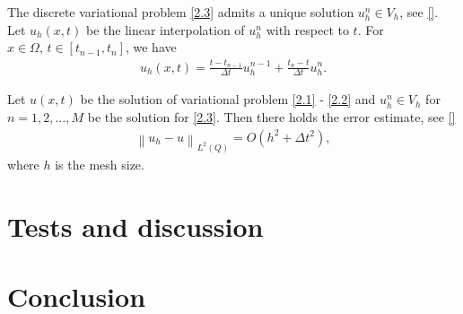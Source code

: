 \documentclass[twocolumn]{article}
\begin{document}
The discrete variational problem \eqref{2.3} admits a unique solution $u^n_h\in V_h$, see \eqref{}. Let $u_h(x, t)$ be the linear interpolation of $u_h^n$ with respect to $t$. 
For $x\in \Omega,\, t\in [t_{n-1}, t_n]$, we have
\begin{align*}
	u_h(x, t)=\frac{t-t_{n-1}}{\Delta t}u_h^{n-1}+\frac{t_n-t}{\Delta t}u_h^{n}.
\end{align*}
\begin{dl}\label{dl2.1}
	Let $u(x, t)$ be the solution of variational problem \eqref{2.1} - \eqref{2.2} and $u^n_h\in V_h$ for $n=1, 2, \dots, M$ be the solution for \eqref{2.3}. Then there holds the error estimate, see \eqref{}
	\begin{align}\label{2.5}
		\left\|u_h-u\right\|_{L^2(Q)}=O\left(h^2+\Delta t^2\right),
	\end{align}
	where $h$ is the mesh size.
\end{dl}



\section{Tests and discussion}



\section{Conclusion}



{}
\vfill
\end{document}
